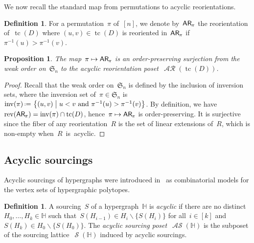 \documentclass{amsart}
\newtheorem{proposition}[theorem]{Proposition}
\theoremstyle{definition}
\newtheorem{definition}[theorem]{Definition}
\renewcommand{\c}[1]{\mathcal{#1}} %
\newcommand{\set}[2]{\left\{ #1 \;\middle|\; #2 \right\}} %
\newcommand{\ssm}{\smallsetminus} %
\newcommand{\eqdef}{\mbox{\,\raisebox{0.2ex}{\scriptsize\ensuremath{\mathrm:}}\ensuremath{=}\,}} %
\DeclareMathOperator{\inv}{inv} %
\DeclareMathOperator{\tc}{tc} %
\newcommand{\darkblue}{\color{darkblue}} %
\newcommand{\defn}[1]{\textsl{\darkblue #1}} %
\newcommand{\fS}{\mathfrak{S}} %
\newcommand{\mymap}[2]{\mathsf{#1}_{\hspace{-.7pt}#2}}
\DeclareMathOperator{\AReori}{\c{AR}}  %
\newcommand{\areori}[1]{\mymap{AR}{#1}}  %
\DeclareMathOperator{\rev}{rev} %
\DeclareMathOperator{\Sour}{\mathcal{S}}  %
\DeclareMathOperator{\ASour}{\mathcal{AS}}  %
\newcommand{\HH}{\mathbb H}  %
\begin{document}
We now recall the standard map from permutations to acyclic reorientations.

\begin{definition}
\label{def:Perm2AReori}
For a permutation~$\pi$ of~$[n]$, we denote by~$\areori{\pi}$ the reorientation of~$\tc(D)$ where $(u,v) \in \tc(D)$ is reoriented in~$\areori{\pi}$ if~$\pi^{-1}(u) > \pi^{-1}(v)$.
\end{definition}

\begin{proposition}
\label{prop:Perm2AReori}
The map~$\pi \mapsto \areori{\pi}$ is an order-preserving surjection from the weak order on~$\fS_n$ to the acyclic reorientation poset~$\AReori(\tc(D))$.
\end{proposition}

\begin{proof}
Recall that the weak order on~$\fS_n$ is defined by the inclusion of inversion sets, where the inversion set of~$\pi \in \fS_n$ is~$\inv(\pi) \eqdef \set{(u,v)}{u < v \text{ and } \pi^{-1}(u) > \pi^{-1}(v)}$.
By definition, we have~$\rev(\areori{\pi}) = \inv(\pi) \cap \tc(D)$, hence~$\pi \mapsto \areori{\pi}$ is order-preserving.
It is surjective since the fiber of any reorientation~$R$ is the set of linear extensions of~$R$, which is non-empty when~$R$~is~acyclic.
\end{proof}


\subsection{Acyclic sourcings}
\label{subsec:acyclicSourcings}

Acyclic sourcings of hypergraphs were introduced in~\cite{BenedettiBergeronMachacek,BergeronPilaud} as combinatorial models for the vertex sets of hypergraphic polytopes.

\begin{definition}
\label{def:ASour}
A sourcing~$S$ of a hypergraph~$\HH$ is \defn{acyclic} if there are no distinct~$H_0, \dots, H_k \in \HH$ such that~$S(H_{i-1}) \in H_i \ssm \{S(H_i)\}$ for all~$i \in [k]$ and~$S(H_k) \in H_0 \ssm \{S(H_0)\}$.
The \defn{acyclic sourcing poset}~$\ASour(\HH)$ is the subposet of the sourcing lattice~$\Sour(\HH)$ induced by acyclic sourcings.
\end{definition}
\end{document}
